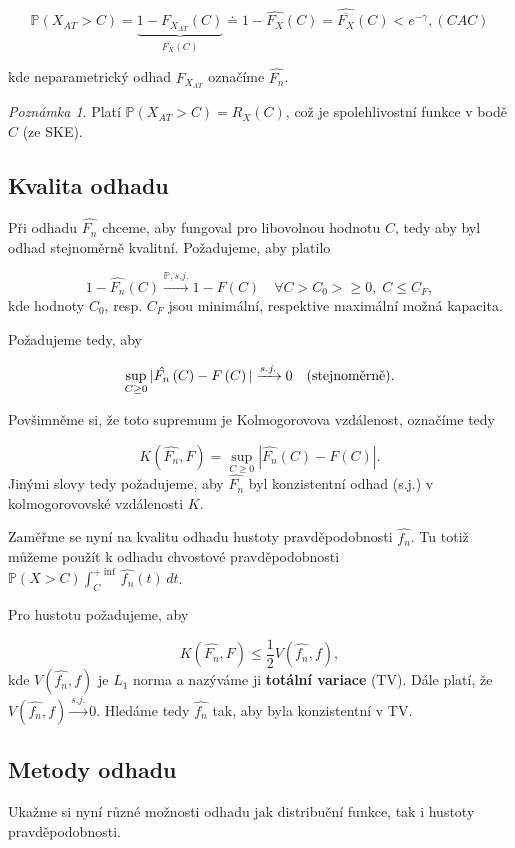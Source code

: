 \documentclass{article}
\theoremstyle{remark}
\newtheorem*{remark}{Poznámka}
\theoremstyle{plain}
\theoremstyle{definition}
\theoremstyle{remark}
\begin{document}
$$
\mathbb{P}\left(X_{AT} > C \right) = \underbrace{1 - F_{X_{AT}}\left(C \right)}_{\overline{F_X}\left(C\right)} \doteq 1 - \hat{F_{X}}\left(C \right) = \hat{\overline{F_X}}\left(C\right) < e^{-\gamma}, (CAC)
$$

kde neparametrický odhad $F_{X_{AT}}$ označíme $\hat{F_n}$.

\begin{remark}
 Platí $\mathbb{P}\left(X_{AT} > C \right) = R_X\left(C\right)$, což je spolehlivostní funkce v bodě $C$ (ze SKE).
\end{remark}

\subsection{Kvalita odhadu}
Při odhadu $\hat{F_n}$ chceme, aby fungoval pro libovolnou hodnotu $C$, tedy aby byl odhad stejnoměrně kvalitní. Požadujeme, aby platilo

$$
1 - \hat{F_n}\left(C \right) \xrightarrow{\mathbb{P}, s.j.} 1 - F\left(C \right) \quad \forall C > C_0 >\geq 0, \; C \leq C_F,
$$
kde hodnoty $C_0$, resp. $C_F$ jsou minimální, respektive maximální možná kapacita.

Požadujeme tedy, aby

$$
\sup_{C \geq 0} |\hat{F_n}\left(C \right) - F\left(C \right)| \xrightarrow{s.j.} 0 \quad \textnormal{(stejnoměrně)}.
$$

Povšimněme si, že toto supremum je Kolmogorovova vzdálenost, označíme tedy

$$
K\left( \hat{F_n},F \right) = \sup_{C \geq 0} |\hat{F_n}\left(C \right) - F\left(C \right)|.
$$
Jinými slovy tedy požadujeme, aby $\hat{F_n}$ byl konzistentní odhad (s.j.) v kolmogorovovské vzdálenosti $K$.

\smallskip

Zaměřme se nyní na kvalitu odhadu hustoty pravděpodobnosti $\hat{f_n}$. Tu totiž můžeme použít k odhadu chvostové pravděpodobnosti $\mathbb{P}\left(X > C\right)\int_{C}^{+\inf} \hat{f_n}(t) \,dt$.

Pro hustotu požadujeme, aby

$$K\left( \hat{F_n},F \right) \leq \frac{1}{2}V\left(\hat{f_n},f\right),
$$
kde $V\left(\hat{f_n},f\right)$ je $L_1$ norma a nazýváme ji \textbf{totální variace} (TV). Dále platí, že $V\left(\hat{f_n},f\right) \xrightarrow{s.j.} 0$. Hledáme tedy $\hat{f_n}$ tak, aby byla konzistentní v TV.

\subsection{Metody odhadu}
Ukažme si nyní různé možnosti odhadu jak distribuční funkce, tak i hustoty pravděpodobnosti.
\end{document}

